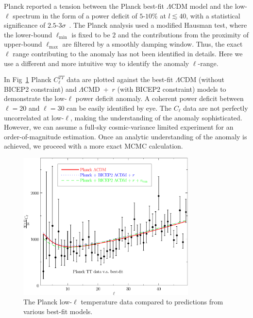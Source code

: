 \documentclass[a4paper,11pt]{article}
\def \figwidth{0.8\textwidth}
\begin{document}
Planck reported a tension between the Planck best-fit $\Lambda$CDM model and the low-$\ell$ spectrum in the form of a power deficit of $5$-$10$\% at $l\lesssim 40$, with a statistical significance of $2.5$-$3\sigma$~\cite{Planck2013PowerSpectra}. The Planck analysis used a modified Hausman test, where the lower-bound $\ell_{\min}$ is fixed to be $2$ and the contributions from the proximity of upper-bound $\ell_{\max}$ are filtered by a smoothly damping window. Thus, the exact $\ell$ range contributing to the anomaly has not been identified in details. Here we use a different and more intuitive way to identify the anomaly $\ell$-range.


In Fig~\ref{fig:dcls} Planck $C_\ell^{TT}$ data are plotted against the best-fit $\Lambda$CDM (without BICEP2 constraint) and $\Lambda$CMD~+~$r$ (with BICEP2 constraint) models to demonstrate the low-$\ell$ power deficit anomaly. A coherent power deficit between $\ell=20$ and $\ell = 30$ can be easily identified by eye. The $C_{\ell}$ data are not perfectly uncorrelated at low-$\ell$, making the understanding of the anomaly sophisticated. However, we can assume a full-sky cosmic-variance limited experiment for an order-of-magnitude estimation. Once an analytic understanding of the anomaly is achieved, we proceed with a more exact MCMC calculation.

\begin{figure}
  \centering
  \includegraphics[width =\figwidth]{dcl.pdf}
  \caption{The Planck low-$\ell$ temperature data compared to predictions from various best-fit models. \label{fig:dcls}}
\end{figure}
\end{document}
